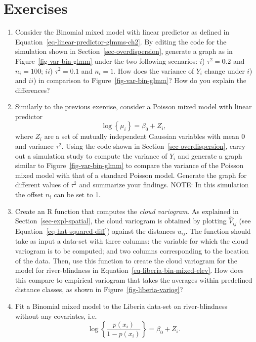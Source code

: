 \documentclass[
  letterpaper,
]{krantz}
\begin{document}
\section{Exercises}\label{exercises-1}

\begin{enumerate}
\def\labelenumi{\arabic{enumi}.}
\item
  Consider the Binomial mixed model with linear predictor as defined in
  Equation~\ref{eq-linear-predictor-glmms-ch2}. By editing the code for
  the simulation shown in Section~\ref{sec-overdispersion}, generate a
  graph as in Figure~\ref{fig-var-bin-glmm} under the two following
  scenarios: \(i\)) \(\tau^2 = 0.2\) and \(n_i=100\); \(ii\))
  \(\tau^2 = 0.1\) and \(n_i = 1\). How does the variance of \(Y_i\)
  change under \(i\)) and \(ii\)) in comparison to
  Figure~\ref{fig-var-bin-glmm}? How do you explain the differences?
\item
  Similarly to the previous exercise, consider a Poisson mixed model
  with linear predictor \[
      \log\left\{\mu_i\right\} = \beta_0 + Z_i,
      \] where \(Z_i\) are a set of mutually independent Gaussian
  variables with mean 0 and variance \(\tau^2\). Using the code shown in
  Section~\ref{sec-overdispersion}, carry out a simulation study to
  compute the variance of \(Y_i\) and generate a graph similar to
  Figure~\ref{fig-var-bin-glmm} to compare the variance of the Poisson
  mixed model with that of a standard Poisson model. Generate the graph
  for different values of \(\tau^2\) and summarize your findings. NOTE:
  In this simulation the offset \(n_i\) can be set to 1.
\item
  Create an R function that computes the \emph{cloud variogram}. As
  explained in Section~\ref{sec-expl-spatial}, the cloud variogram is
  obtained by plotting \(\hat{V}_{ij}\) (see
  Equation~\ref{eq-hat-squared-diff}) against the distances \(u_{ij}\).
  The function should take as input a data-set with three columns: the
  variable for which the cloud variogram is to be computed; and two
  columns corresponding to the location of the data. Then, use this
  function to create the cloud variogram for the model for
  river-blindness in Equation~\ref{eq-liberia-bin-mixed-elev}. How does
  this compare to empirical variogram that takes the averages within
  predefined distance classes, as shown in
  Figure~\ref{fig-liberia-variog}?
\item
  Fit a Binomial mixed model to the Liberia data-set on river-blindness
  without any covariates, i.e.~\[
      \log\left\{\frac{p(x_i)}{1-p(x_i)}\right\} = \beta_0 + Z_i.
\]
\end{enumerate}
\end{document}
